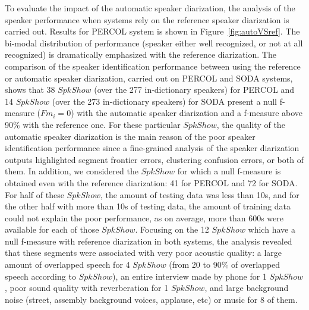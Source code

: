 
To evaluate the impact of the automatic speaker diarization, the analysis of the speaker performance when systems rely on the reference speaker diarization is carried out. Results for PERCOL system is shown in Figure~\ref{fig:autoVSref}.  The bi-modal distribution of performance (speaker either well recognized, or not at all recognized) is dramatically emphasized with the reference diarization.
The comparison of the speaker identification performance between using the reference or automatic speaker diarization, carried out on PERCOL and SODA systems, shows that 38 $SpkShow$ (over the 277 in-dictionary speakers) for PERCOL and 14 $SpkShow$ (over the 273 in-dictionary speakers) for SODA present a null f-measure ($Fm_i=0$) with the automatic speaker diarization and a f-measure above 90\% with the reference one. For these particular $SpkShow$, the quality of the automatic speaker diarization is the main reason of the poor speaker identification performance since a fine-grained analysis of the speaker diarization outputs highlighted segment frontier errors, clustering confusion errors, or both of them. 
In addition, we considered the $SpkShow$ for which a null f-measure is obtained even with the reference diarization: 41 for PERCOL and 72 for SODA. For half of these $SpkShow$, the amount of testing data was less than 10s, and for the other half with more than 10s of testing data, the amount of training data could not explain the poor performance, as on average, more than 600s were available for each of those $SpkShow$.
Focusing on the 12 $SpkShow$ which have a null f-measure with reference diarization in both systems, the analysis revealed that these segments were associated with very poor acoustic quality: a large amount of overlapped speech for 4 $SpkShow$ (from 20 to 90\% of overlapped speech according to  $SpkShow$), an entire interview made by phone for 1 $SpkShow$, poor sound quality with reverberation for 1 $SpkShow$, and large background noise (street, assembly background voices, applause, etc) or music for 8 of them.

